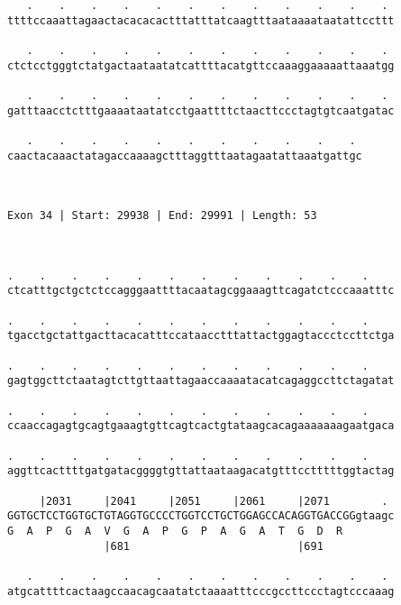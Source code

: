 \documentclass{article}
\begin{document}
\begin{Verbatim}
   .    .    .    .    .    .    .    .    .    .    .    . 
ttttccaaattagaactacacacactttatttatcaagtttaataaaataatattccttt
                                                            
   .    .    .    .    .    .    .    .    .    .    .    . 
ctctcctgggtctatgactaataatatcattttacatgttccaaaggaaaaattaaatgg
                                                            
   .    .    .    .    .    .    .    .    .    .    .    . 
gatttaacctctttgaaaataatatcctgaattttctaacttccctagtgtcaatgatac
                                                            
   .    .    .    .    .    .    .    .    .    .    . 
caactacaaactatagaccaaaagctttaggtttaatagaatattaaatgattgc
                                                       
                                                       
 
Exon 34 | Start: 29938 | End: 29991 | Length: 53



.    .    .    .    .    .    .    .    .    .    .    .    
ctcatttgctgctctccagggaattttacaatagcggaaagttcagatctcccaaatttc
                                                            
.    .    .    .    .    .    .    .    .    .    .    .    
tgacctgctattgacttacacatttccataacctttattactggagtaccctccttctga
                                                            
.    .    .    .    .    .    .    .    .    .    .    .    
gagtggcttctaatagtcttgttaattagaaccaaaatacatcagaggccttctagatat
                                                            
.    .    .    .    .    .    .    .    .    .    .    .    
ccaaccagagtgcagtgaaagtgttcagtcactgtataagcacagaaaaaaagaatgaca
                                                            
.    .    .    .    .    .    .    .    .    .    .    .    
aggttcacttttgatgatacggggtgttattaataagacatgtttcctttttggtactag
                                                            
     |2031     |2041     |2051     |2061     |2071        . 
GGTGCTCCTGGTGCTGTAGGTGCCCCTGGTCCTGCTGGAGCCACAGGTGACCGGgtaagc
G  A  P  G  A  V  G  A  P  G  P  A  G  A  T  G  D  R        
               |681                          |691           
  
   .    .    .    .    .    .    .    .    .    .    .    . 
atgcattttcactaagccaacagcaatatctaaaatttcccgccttccctagtcccaaag
                                                            

\end{Verbatim}
\end{document}
